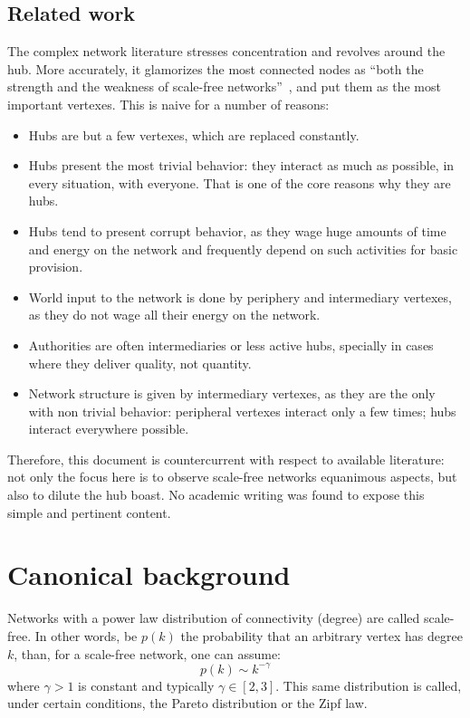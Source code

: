 \documentclass[a4paper, 11pt]{article} %
\begin{document}
\subsection{Related work}\label{sec:rel}
The complex network literature stresses concentration and revolves around the hub. 
More accurately, it glamorizes the most connected nodes as ``both the strength and the weakness of scale-free networks''~\cite{wikipedia}, and put them as the most important vertexes. This is naive for a number of reasons:
\begin{itemize}
    \item Hubs are but a few vertexes, which are replaced constantly.
    \item Hubs present the most trivial behavior: they interact as much as possible, in every situation, with everyone. That is one of the core reasons why they are hubs.
    \item Hubs tend to present corrupt behavior, as they wage huge amounts of time and energy on the network and frequently depend on such activities for basic provision.
    \item World input to the network is done by periphery and intermediary vertexes, as they do not wage all their energy on the network.
    \item Authorities are often intermediaries or less active hubs, specially in cases where they deliver quality, not quantity.
    \item Network structure is given by intermediary vertexes, as they are the only with non trivial behavior: peripheral vertexes interact only a few times; hubs interact everywhere possible.
\end{itemize}

Therefore, this document is countercurrent with respect to available literature: not only the focus here is to observe scale-free networks equanimous aspects, but also to dilute the hub boast. No academic writing was found to expose this simple and pertinent content.

\section{Canonical background}\label{sec:can}
Networks with a power law distribution of connectivity (degree) are called scale-free. In other words, be $p(k)$ the probability that an arbitrary vertex has degree $k$, than, for a scale-free network, one can assume:
\begin{equation}
p(k) \sim k^{-\gamma}
\end{equation}
\noindent where $\gamma > 1$ is constant and typically $\gamma \in [2,3]$. This same distribution is called, under certain conditions, the Pareto distribution or the Zipf law.
\end{document}
